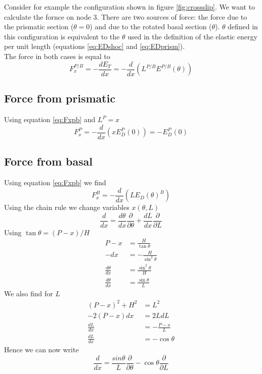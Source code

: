 \documentclass[10pt,a4paper,final]{article}
\begin{document}
Consider for example the configuration shown in figure \ref{fig:crossslip}. We want to calculate the fornce on node 3. There are two sources of force: the force due to the prismatic section ($\theta=0$) and due to the rotated basal section ($\theta$). $\theta$ defined in this configuration is equivalent to the $\theta$ used in the definition of the elastic energy per unit length (equations \ref{eq:EDshoc} and \ref{eq:EDprism}). \\
The force in both cases is equal to 
\begin{equation}
F^{P/B}_x = -\frac{d E_T}{d x} = -\frac{d}{d x}\left(L^{P/B}E^{P/B}(\theta)\right) \label{eq:Fxpb}
\end{equation}

\subsection{Force from prismatic}
Using equation \ref{eq:Fxpb} and $L^P = x$
\begin{equation}
F^{P}_x = -\frac{d}{d x}\left(xE^P_D(0)\right) = -E^P_D(0)
\label{eq:FxP}
\end{equation}

\subsection{Force from basal}
Using equation \ref{eq:Fxpb} we find
\begin{equation*}
F_x^B = -\frac{d}{dx}\left(L E_D(\theta)^B\right)
\end{equation*}
Using the chain rule we change variables $x(\theta,L)$
\begin{equation*}
\frac{d}{dx} = \frac{d\theta}{dx}\frac{\partial}{\partial\theta} + \frac{dL}{dx}\frac{\partial}{\partial L}
\end{equation*}
Using $\tan\theta = (P-x)/H$
\begin{align*}
P-x &= \frac{H}{\tan\theta} \\
-dx &= -\frac{H}{\sin^2\theta} \\
\frac{d\theta}{dx} &= \frac{\sin^2\theta}{H} \\
\frac{d\theta}{dx} &= \frac{\sin\theta}{L}
\end{align*}  
We also find for $L$
\begin{align*}
(P-x)^2 + H^2 &= L^2 \\
-2(P-x)dx &= 2LdL \\
\frac{dL}{dx} &= -\frac{P-x}{L} \\
\frac{dL}{dx} &= -\cos\theta
\end{align*}
Hence we can now write
\begin{equation}
\frac{d}{dx} = \frac{sin\theta}{L}\frac{\partial}{\partial\theta} - \cos\theta\frac{\partial}{\partial L} \label{eq:chainx}
\end{equation}
\end{document}
